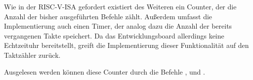 Wie in der RISC-V-ISA gefordert existiert des Weiteren ein Counter, der die Anzahl der bisher ausgef\"uhrten Befehle z\"ahlt. Au\ss{}erdem umfasst die Implementierung auch einen Timer, der analog dazu die Anzahl der bereits vergangenen Takte speichert. Da das Entwicklungsboard allerdings keine Echtzeituhr
bereitstellt, greift die Implementierung dieser Funktionalit\"at auf den Taktz\"ahler zur\"uck.

Ausgelesen werden k\"onnen diese Counter durch die Befehle
\nolinebreak{},  und .

